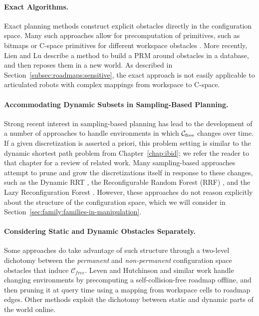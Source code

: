 \paragraph{Exact Algorithms.}
Exact planning methods construct explicit obstacles
directly in the configuration space.
Many such approaches allow for precomputation of primitives,
such as bitmaps \citep{kavraki1995cspacefft}
or C-space primitives for different workspace obstacles
\citep{newmanbranicky1991cspacetransforms}.
More recently,
Lien and Lu \citep{lien2009similarobstacles} describe a method to
build a PRM around obstacles in a database,
and then reposes them in a new world.
As described in Section~\ref{subsec:roadmaps:sensitive},
the exact approach is not easily applicable to articulated robots
with complex mappings from workspace to C-space.

\paragraph{Accommodating Dynamic Subsets in Sampling-Based Planning.}
Strong recent interest in sampling-based planning
has lead to the development of a number of approaches to handle
environments in which $\mathcal{C}_{\mbox{\scriptsize free}}$ changes over time.
If a given discretization is asserted a priori,
this problem setting is similar to the dynamic shortest path problem
from Chapter~\ref{chap:ibid};
we refer the reader to that chapter for a review of related work.
Many sampling-based approaches attempt to prune and grow
the discretizations itself in response to these changes,
such as the Dynamic RRT \citep{ferguson2006drrt},
the Reconfigurable Random Forest (RRF)
\citep{li2002incrementalprmmanagement},
and the Lazy Reconfiguration Forest
\citep{gayle2007lazyreconfigforest}.
However, these approaches do not reason explicitly about the
structure of the configuration space,
which we will consider
in Section~\ref{sec:family:families-in-manipulation}.

\paragraph{Considering Static and Dynamic Obstacles Separately.}
Some approaches do take advantage of such structure
through a two-level dichotomy between
the \emph{permanent} and \emph{non-permanent} configuration space
obstacles that induce $\mathcal{C}_{free}$.
Leven and Hutchinson \citep{leven2000changing}
and similar work \citep{kallman2004dynamicroadmaps}
handle changing environments by
precomputing a self-collision-free roadmap offline,
and then pruning it at query time
using a mapping from workspace cells to roadmap edges.
Other methods \citep{jaillet2004dynamicprm}
exploit the dichotomy between static and dynamic parts of
the world online.

